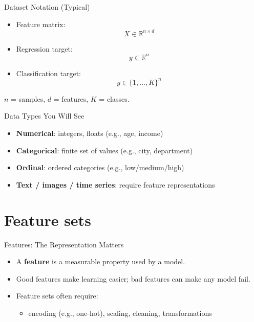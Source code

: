 \documentclass[aspectratio=169]{beamer}
\begin{document}
\begin{frame}{Dataset Notation (Typical)}
  \begin{itemize}[<+->]
    \item Feature matrix:
    \[
      X \in \mathbb{R}^{n \times d}
    \]
    \item Regression target:
    \[
      y \in \mathbb{R}^{n}
    \]
    \item Classification target:
    \[
      y \in \{1,\dots,K\}^{n}
    \]
  \end{itemize}
  \vspace{0.2em}
  \small $n$ = samples, $d$ = features, $K$ = classes.
\end{frame}

\begin{frame}{Data Types You Will See}
  \begin{itemize}[<+->]
    \item \textbf{Numerical}: integers, floats (e.g., age, income)
    \item \textbf{Categorical}: finite set of values (e.g., city, department)
    \item \textbf{Ordinal}: ordered categories (e.g., low/medium/high)
    \item \textbf{Text / images / time series}: require feature representations
  \end{itemize}
\end{frame}

\section{Feature sets}
\label{sec:features}

\begin{frame}{Features: The Representation Matters}
  \begin{itemize}[<+->]
    \item A \textbf{feature} is a measurable property used by a model.
    \item Good features make learning easier; bad features can make any model fail.
    \item Feature sets often require:
      \begin{itemize}
        \item encoding (e.g., one-hot), scaling, cleaning, transformations
      \end{itemize}
  \end{itemize}
\end{frame}
\end{document}
